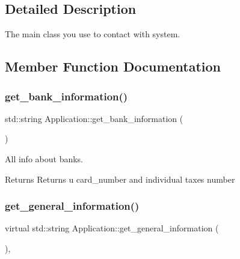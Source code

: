 \subsection{Detailed Description}
The main class you use to contact with system. 

\subsection{Member Function Documentation}
\mbox{\label{classApplication_a7900e26bc4f0e728af2f09f231d4d930}} 
\subsubsection{\texorpdfstring{get\+\_\+bank\+\_\+information()}{get\_bank\_information()}}
{\footnotesize\ttfamily std\+::string Application\+::get\+\_\+bank\+\_\+information (\begin{DoxyParamCaption}{ }\end{DoxyParamCaption})\hspace{0.3cm}{\ttfamily [inline]}}



All info about banks. 

\begin{DoxyReturn}{Returns}
Returns u card\+\_\+number and individual taxes number 
\end{DoxyReturn}
\mbox{\label{classApplication_ab53eea16f9023504def363a58eee2240}} 
\subsubsection{\texorpdfstring{get\+\_\+general\+\_\+information()}{get\_general\_information()}}
{\footnotesize\ttfamily virtual std\+::string Application\+::get\+\_\+general\+\_\+information (\begin{DoxyParamCaption}{ }\end{DoxyParamCaption})\hspace{0.3cm}{\ttfamily [inline]}, {\ttfamily [virtual]}}




